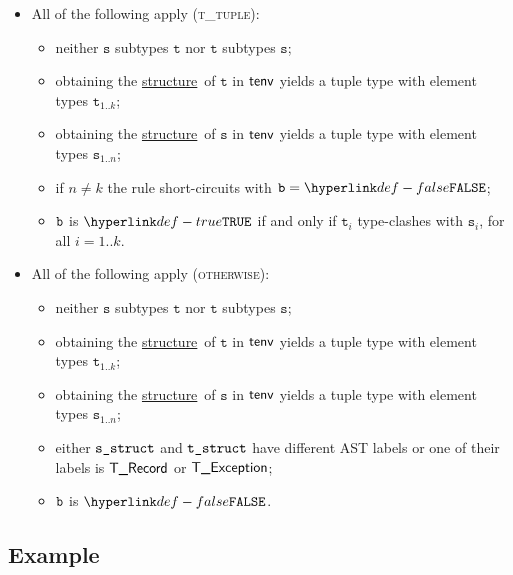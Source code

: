 \documentclass{book}
\newcommand\structure[0]{\hyperlink{def-structure}{structure}}
\newcommand\vt[0]{\texttt{t}}
\newcommand\vs[0]{\texttt{s}}
\begin{document}
\begin{itemize}
  \item All of the following apply (\textsc{t\_tuple}):
  \begin{itemize}
    \item neither $\vs$ subtypes $\vt$ nor $\vt$ subtypes $\vs$;
    \item obtaining the \structure\ of $\vt$ in $\textsf{tenv}$ yields a tuple type with element types $\vt_{1..k}$;
    \item obtaining the \structure\ of $\vs$ in $\textsf{tenv}$ yields a tuple type with element types $\vs_{1..n}$;
    \item if $n \neq k$ the rule short-circuits with $\vb=\False$;
    \item $\texttt{b}$ is $\True$ if and only if $\vt_i$ type-clashes with $\vs_i$, for all $i=1..k$.
  \end{itemize}

  \item All of the following apply (\textsc{otherwise}):
  \begin{itemize}
    \item neither $\vs$ subtypes $\vt$ nor $\vt$ subtypes $\vs$;
    \item obtaining the \structure\ of $\vt$ in $\textsf{tenv}$ yields a tuple type with element types $\vt_{1..k}$;
    \item obtaining the \structure\ of $\vs$ in $\textsf{tenv}$ yields a tuple type with element types $\vs_{1..n}$;
    \item either $\texttt{s\_struct}$ and $\texttt{t\_struct}$ have different AST labels or one of their labels
    is $\textsf{T\_Record}$ or $\textsf{T\_Exception}$;
    \item $\texttt{b}$ is $\False$.
  \end{itemize}
\end{itemize}

\subsection{Example}

\end{document}
